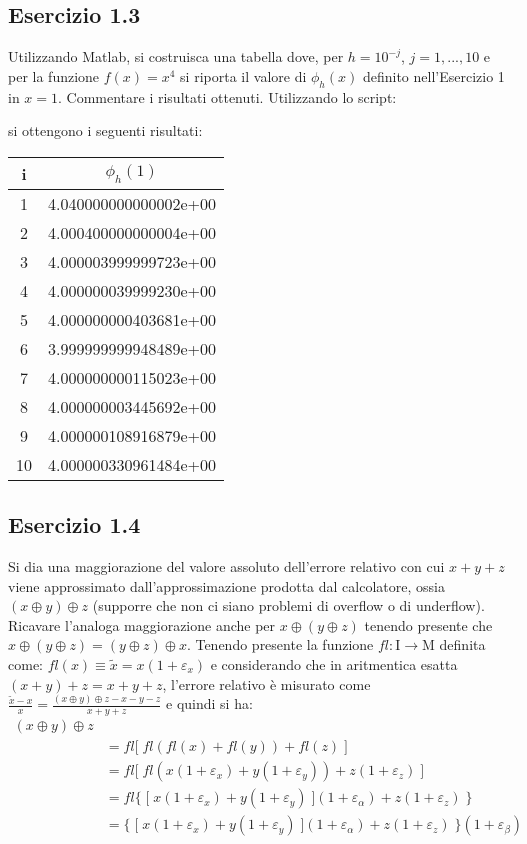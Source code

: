 	\subsection{Esercizio 1.3}
	
Utilizzando Matlab, si costruisca una tabella dove, per $h = 10^{-j}$, $j =1, . . . , 10$ e per la funzione $f(x) = x^{4}$ si riporta il valore di $\phi_h(x)$ definito nell'Esercizio 1 in $x = 1$. Commentare i risultati ottenuti.
\PP
Utilizzando lo script:

si ottengono i seguenti risultati:
\begin{tabular}{ c | c }
i & $\phi_h(1)$ \\
\hline
1  & 4.040000000000002e+00 \\
2  & 4.000400000000004e+00 \\
3  & 4.000003999999723e+00 \\
4  & 4.000000039999230e+00 \\
5  & 4.000000000403681e+00 \\
6  & 3.999999999948489e+00 \\
7  & 4.000000000115023e+00 \\
8  & 4.000000003445692e+00 \\
9  & 4.000000108916879e+00 \\
10 & 4.000000330961484e+00 \\
\end{tabular}

	\subsection{Esercizio 1.4}
	
Si dia una maggiorazione del valore assoluto dell’errore relativo con cui $x + y + z$ viene approssimato dall’approssimazione prodotta dal calcolatore, ossia $(x \oplus y) \oplus z$ (supporre che non ci siano problemi di overflow o di underflow). Ricavare l’analoga maggiorazione anche per $x \oplus (y \oplus z)$ tenendo presente che $x \oplus (y \oplus z) = (y \oplus z) \oplus x$.
\PP
Tenendo presente la funzione $fl: \mathrm{I} \rightarrow \mathrm{M}$ definita come: $fl(x) \equiv \tilde{x} = x(1+\varepsilon_x)$ e considerando che in aritmentica esatta $(x+y)+z = x+y+z$, l'errore relativo è misurato come $\frac{\tilde{x}-x}{x} = \frac{(x \oplus y) \oplus z - x - y - z}{x+y+z}$ e quindi si ha:
\begin{equation*}
	\begin{split}
		(x \oplus y) \oplus z \\
			& = fl \lbrack \; fl(fl(x) + fl(y)) + fl(z) \;\rbrack \\
			& = fl \lbrack \; fl(x(1+\varepsilon_x) + y(1+\varepsilon_y)) + z(1+\varepsilon_z) \; \rbrack \\
			& = fl \{ \; \lbrack \; x(1+\varepsilon_x) + y(1+\varepsilon_y) \; \rbrack (1 + \varepsilon_{\alpha}) + z(1+\varepsilon_z) \; \} \\
	  		& = \{ \; \lbrack \; x(1+\varepsilon_x) + y(1+\varepsilon_y) \; \rbrack (1 + \varepsilon_{\alpha}) + z(1+\varepsilon_z) \; \} (1 + \varepsilon_{\beta}) \\
	\end{split}
\end{equation*}

